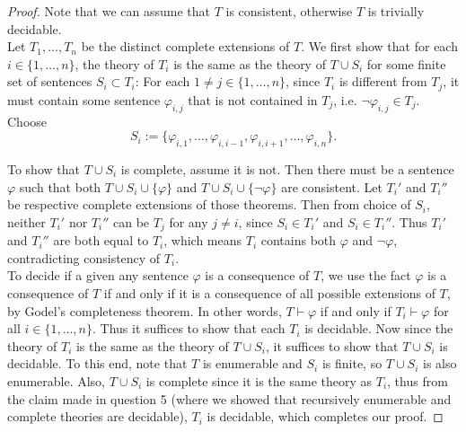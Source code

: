 \documentclass{article}
\begin{document}
\begin{enumerate}[label={\bf Q\arabic*:}]
    \begin{proof}
      Note that we can assume that $T$ is consistent, otherwise $T$ is
      trivially decidable. \\

      Let $T_1,\ldots,T_n$ be the distinct complete extensions of $T$.
      We first show that for each $i\in\{1,\ldots,n\}$, the theory of $T_i$
      is the same as the theory of $T\cup S_i$ for some finite set of
      sentences $S_i\subset T_i$: For each $1\neq j\in\{1,\ldots,n\}$,
      since $T_i$ is different from $T_j$, it must contain some sentence
      $\varphi_{i,j}$ that is not contained in $T_j$, i.e.
      $\neg\varphi_{i,j}\in T_j$. Choose
      \[S_i :=\{\varphi_{i,1},\ldots,\varphi_{i,i-1},
      \varphi_{i,i+1},\ldots,\varphi_{i,n}\}.\]

      To show that $T\cup S_i$ is complete, assume it is not. Then there
      must be a sentence $\varphi$ such that both $T\cup
      S_i\cup\{\varphi\}$ and $T\cup S_i\cup\{\neg\varphi\}$ are
      consistent. Let $T_i'$ and $T_i''$ be respective complete extensions
      of those theorems. Then from choice of $S_i$, neither $T_i'$ nor
      $T_i''$ can be $T_j$ for any $j\neq i$, since $S_i\in T_i'$ and
      $S_i\in T_i''$. Thus $T_i'$ and $T_i''$ are both equal to $T_i$,
      which means $T_i$ contains both $\varphi$ and $\neg\varphi$,
      contradicting consistency of $T_i$. \\

      To decide if a given any sentence $\varphi$ is a consequence of $T$,
      we use the fact $\varphi$ is a consequence of $T$ if and only if it
      is a consequence of all possible extensions of $T$, by Godel's
      completeness theorem. In other words, $T\vdash\varphi$ if and only if
      $T_i\vdash\varphi$ for all $i\in\{1,\ldots,n\}$. Thus it suffices to
      show that each $T_i$ is decidable. Now since the theory of $T_i$ is
      the same as the theory of $T\cup S_i$, it suffices to show that
      $T\cup S_i$ is decidable. To this end, note that $T$ is enumerable
      and $S_i$ is finite, so $T\cup S_i$ is also enumerable. Also, $T\cup
      S_i$ is complete since it is the same theory as $T_i$, thus from the
      claim made in question 5 (where we showed that recursively enumerable
      and complete theories are decidable), $T_i$ is decidable, which
      completes our proof.
    \end{proof}
\end{enumerate}
\end{document}
